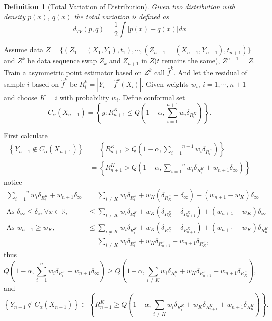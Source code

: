 \documentclass[12pt, a4paper, oneside]{article}
\newtheorem{definition}[theorem]{Definition}
\begin{document}
    \begin{definition}[Total Variation of Distribution]
        Given two distribution with density $p(x),\ q(x)$ the total variation is defined as
        \begin{equation*}
            d_{TV}(p,q)=\dfrac{1}{2}\int|p(x)-q(x)|dx
        \end{equation*}
    \end{definition}


    Assume data $Z=\{(Z_1=(X_1,Y_1),t_1),\cdots,(Z_{n+1}=(X_{n+1},Y_{n+1}),t_{n+1})\}$ and $Z^k$ be data sequence swap $Z_k$ and $Z_{n+1}$ in $Z$($t$ remains the same), $Z^{n+1}=Z$. Train a asymmetric point estimator based on $Z^k$ call $\hat{f}^k$. And let the residual of sample $i$ based on $\hat{f}^k$ be $R_i^k=|Y_i-\hat{f}^k(X_i)|$. Given weights $w_i,\ i=1,\cdots,n+1$ and choose $K=i$ with probability $w_i$. Define conformal set
    \begin{equation*}
        C_\alpha(X_{n+1})=\left\{ y:R_{n+1}^K\leq Q(1-\alpha,\overset{n+1}{\underset{i=1}\sum}w_i\delta_{R_i^K}) \right\}.
    \end{equation*}


    First calculate
    \begin{align*}
        \left\{ Y_{n+1}\notin C_\alpha(X_{n+1}) \right\}&=\left\{ R_{n+1}^K> Q(1-\alpha,\overset{n+1}{\underset{i=1}\sum}w_i\delta_{R_i^K}) \right\}\\
        &=\left\{ R_{n+1}^K> Q(1-\alpha,\overset{n}{\underset{i=1}\sum}w_i\delta_{R_i^K}+w_{n+1}\delta_{\infty}) \right\}
    \end{align*}
    notice
    \begin{align*}
        \overset{n}{\underset{i=1}\sum}w_i\delta_{R_i^K}+w_{n+1}\delta_{\infty}&=\overset{}{\underset{i\neq K}\sum}w_i\delta_{R_i^K}+w_K(\delta_{R_K^K}+\delta_{\infty})+(w_{n+1}-w_K)\delta_{\infty}\\
        \text{As $\delta_{\infty}\leq\delta_{x},\forall x\in\mathbb{R}$, }&\leq\overset{}{\underset{i\neq K}\sum}w_i\delta_{R_i^K}+w_K(\delta_{R_K^K}+\delta_{R_{n+1}^K})+(w_{n+1}-w_K)\delta_{\infty}\\
        \text{As $w_{n+1}\geq w_K$, }&\leq\overset{}{\underset{i\neq K}\sum}w_i\delta_{R_i^K}+w_K(\delta_{R_K^K}+\delta_{R_{n+1}^K})+(w_{n+1}-w_K)\delta_{R_K^K}\\
        &=\overset{}{\underset{i\neq K}\sum}w_i\delta_{R_i^K}+w_K\delta_{R_{n+1}^K}+w_{n+1}\delta_{R_K^K},
    \end{align*}
    thus
    \begin{equation*}
        Q(1-\alpha,\overset{n}{\underset{i=1}\sum}w_i\delta_{R_i^K}+w_{n+1}\delta_{\infty})\geq Q(1-\alpha,\overset{}{\underset{i\neq K}\sum}w_i\delta_{R_i^K}+w_K\delta_{R_{n+1}^K}+w_{n+1}\delta_{R_K^K}),
    \end{equation*}
    and
    \begin{equation*}
        \left\{ Y_{n+1}\notin C_\alpha(X_{n+1}) \right\}\subset\left\{ R_{n+1}^K\geq Q(1-\alpha,\overset{}{\underset{i\neq K}\sum}w_i\delta_{R_i^K}+w_K\delta_{R_{n+1}^K}+w_{n+1}\delta_{R_K^K}) \right\}.
    \end{equation*}
\end{document}
